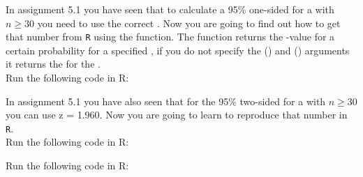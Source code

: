 

In assignment 5.1 you have seen that to calculate a 95\% one-sided  for a  with $n \geq 30$ you need to use the correct . Now you are going to find out how to get that number from \texttt{R} using the  function. The  function returns the -value for a certain probability for a specified , if you do not specify the  () and  () arguments it returns the  for the . \\

Run the following code in R: \\




In assignment 5.1 you have also seen that for the 95\% two-sided  for a  with $n \geq 30$ you can use z = 1.960. Now you are going to learn to reproduce that number in \texttt{R}. \\

Run the following code in R: \\




\clearpage %

Run the following code in R: \\

